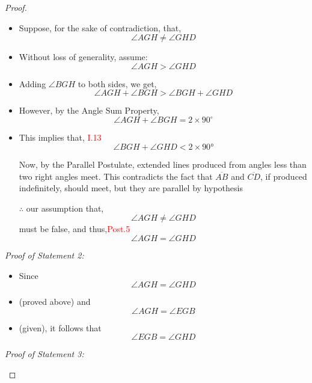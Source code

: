 \begin{proof}

\begin{itemize}
\textit{Proof of Statement 1:} 

\item Suppose, for the sake of contradiction, that,  
\[\angle{AGH} \neq \angle{GHD}\] 

\clearpage

\item Without loss of generality, assume:
\[\angle{AGH} > \angle{GHD}\] 

\item Adding $\angle{BGH}$ to both sides, we get,
 \[\angle{AGH} + \angle{BGH} > \angle{BGH} + \angle{GHD}\]

\item However, by the Angle Sum Property, 
\[\angle{AGH} + \angle{BGH} = 2\times90^\circ\]

\item This implies that, \hfill\textcolor{red}{I.13}
\[\angle{BGH} + \angle{GHD} <2\times\ang{90}\] 

Now, by the Parallel Postulate, extended lines produced from angles less than two right angles meet. This contradicts the fact that $\overline{AB}$ and $\overline{CD}$, if produced indefinitely, should meet, but they are parallel by hypothesis 

\item[$\therefore$] our assumption that, 
\[\angle{AGH} \neq \angle{GHD}\]
must be false, and thus,\hfill\textcolor{red}{Post.5}
\[\angle{AGH} = \angle{GHD}\] 

\end{itemize}

\clearpage

\textit{Proof of Statement 2:} 

\begin{itemize}

\item Since 
\[\angle{AGH} = \angle{GHD}\] 

\item (proved above) and 
\[\angle{AGH} = \angle{EGB}\] 

\item (given), it follows that 
\[\angle{EGB} = \angle{GHD}\]

\end{itemize}

\textit{Proof of Statement 3:} 

\begin{itemize}


\end{itemize}
\end{proof}
